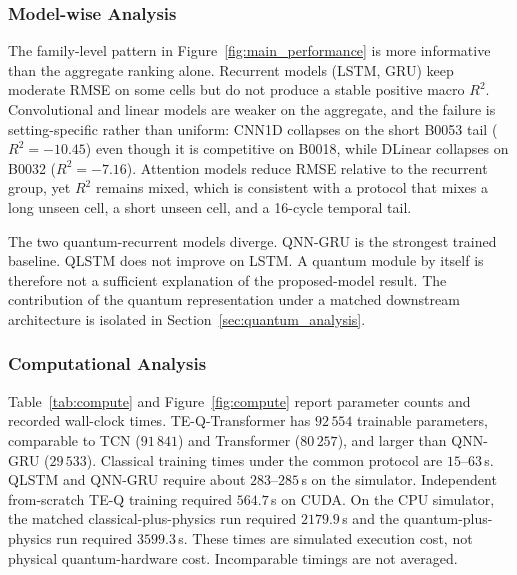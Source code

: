 \subsubsection{Model-wise Analysis}
\label{sec:modelwise}

The family-level pattern in Figure~\ref{fig:main_performance} is more informative than the aggregate ranking alone. Recurrent models (LSTM, GRU) keep moderate RMSE on some cells but do not produce a stable positive macro $R^2$. Convolutional and linear models are weaker on the aggregate, and the failure is setting-specific rather than uniform: CNN1D collapses on the short B0053 tail ($R^2=-10.45$) even though it is competitive on B0018, while DLinear collapses on B0032 ($R^2=-7.16$). Attention models reduce RMSE relative to the recurrent group, yet $R^2$ remains mixed, which is consistent with a protocol that mixes a long unseen cell, a short unseen cell, and a 16-cycle temporal tail.

The two quantum-recurrent models diverge. QNN-GRU is the strongest trained baseline. QLSTM does not improve on LSTM. A quantum module by itself is therefore not a sufficient explanation of the proposed-model result. The contribution of the quantum representation under a matched downstream architecture is isolated in Section~\ref{sec:quantum_analysis}.

\subsubsection{Computational Analysis}
\label{sec:computational_analysis}

Table~\ref{tab:compute} and Figure~\ref{fig:compute} report parameter counts and recorded wall-clock times. TE-Q-Transformer has $92\,554$ trainable parameters, comparable to TCN ($91\,841$) and Transformer ($80\,257$), and larger than QNN-GRU ($29\,533$). Classical training times under the common protocol are $15$--$63$\,s. QLSTM and QNN-GRU require about $283$--$285$\,s on the simulator. Independent from-scratch TE-Q training required $564.7$\,s on CUDA. On the CPU simulator, the matched classical-plus-physics run required $2179.9$\,s and the quantum-plus-physics run required $3599.3$\,s. These times are simulated execution cost, not physical quantum-hardware cost. Incomparable timings are not averaged.


